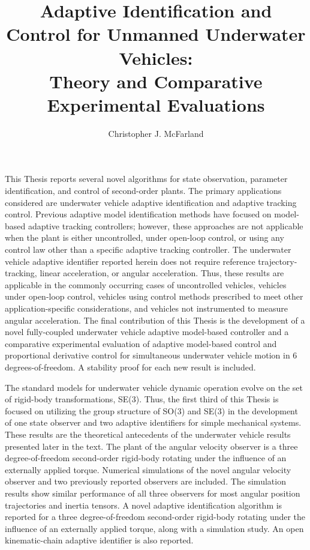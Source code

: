 \documentclass{article}
\begin{document}
 


\title{ Adaptive Identification and Control for Unmanned Underwater Vehicles:\\
Theory and Comparative Experimental Evaluations}

\author{Christopher J. McFarland}

\maketitle

This Thesis reports several novel algorithms for state observation,
parameter identification, and control of second-order plants.  The
primary applications considered are underwater vehicle adaptive
identification and adaptive tracking control. Previous adaptive model
identification methods have focused on model-based adaptive tracking
controllers; however, these approaches are not applicable when the
plant is either uncontrolled, under open-loop control, or using any
control law other than a specific adaptive tracking controller.  The
underwater vehicle adaptive identifier reported herein does not
require reference trajectory-tracking, linear acceleration, or angular
acceleration.  Thus, these results are applicable in the commonly
occurring cases of uncontrolled vehicles, vehicles under open-loop
control, vehicles using control methods prescribed to meet other
application-specific considerations, and vehicles not instrumented to
measure angular acceleration. The final contribution of this Thesis is
the development of a novel fully-coupled underwater vehicle adaptive
model-based controller and a comparative experimental evaluation of
adaptive model-based control and proportional derivative control for
simultaneous underwater vehicle motion in 6 degrees-of-freedom. A
stability proof for each new result is included.

The standard models for underwater vehicle dynamic operation evolve on the set of
rigid-body transformations, SE(3).  Thus, the first third of this
Thesis is focused on utilizing the group structure of SO(3) and SE(3)
in the development of one state observer and two adaptive identifiers
for simple mechanical systems. These results are the theoretical
antecedents of the underwater vehicle results presented later in the text.  The plant
of the angular velocity observer is a three degree-of-freedom
second-order rigid-body rotating under the influence of an externally
applied torque.  Numerical simulations of the novel angular velocity
observer and two previously reported observers are included.  The
simulation results show similar performance of all three observers for
most angular position trajectories and inertia tensors.  A novel
adaptive identification algorithm is reported for a three
degree-of-freedom second-order rigid-body rotating under the influence
of an externally applied torque, along with a simulation study. An
open kinematic-chain adaptive identifier is also reported.
\end{document}
